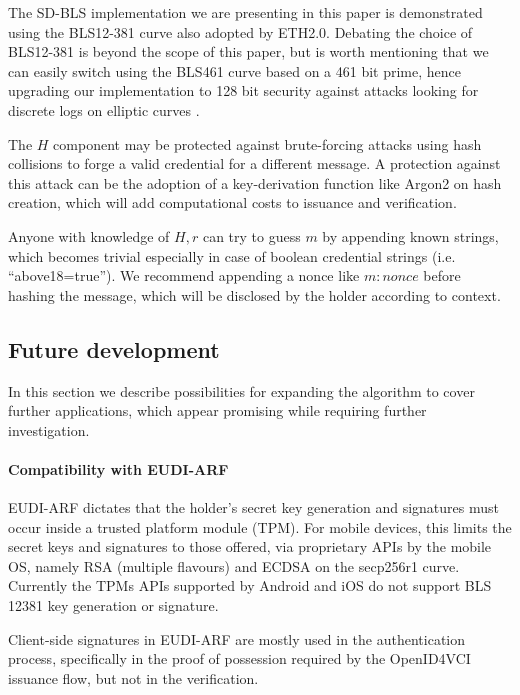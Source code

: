 The SD-BLS implementation we are presenting in this paper is
demonstrated using the BLS12-381 curve \cite{bls381-12} also adopted
by ETH2.0. Debating the choice of BLS12-381 is beyond the scope of
this paper, but is worth mentioning that we can easily switch using
the BLS461 curve based on a 461 bit prime, hence upgrading our
implementation to 128 bit security \cite{updating-key-pairings}
against attacks looking for discrete logs on elliptic curves
\cite{discrete-log-attack}.

The $H$ component may be protected against brute-forcing attacks using
hash collisions to forge a valid credential for a different message. A
protection against this attack can be the adoption of a key-derivation
function like Argon2 \cite{argon2} on hash creation, which will add
computational costs to issuance and verification.

Anyone with knowledge of $H,r$ can try to guess $m$ by appending known
strings, which becomes trivial especially in case of boolean
credential strings (i.e. ``above18=true''). We recommend appending a
nonce like $m:nonce$ before hashing the message, which will be
disclosed by the holder according to context.

\subsection{Future development}

In this section we describe possibilities for expanding the algorithm
to cover further applications, which appear promising while requiring
further investigation.

\paragraph{Compatibility with EUDI-ARF}

EUDI-ARF dictates that the holder's secret key generation and
signatures must occur inside a trusted platform module (TPM). For
mobile devices, this limits the secret keys and signatures to those
offered, via proprietary APIs by the mobile OS, namely RSA (multiple
flavours) and ECDSA on the secp256r1 curve. Currently the TPMs APIs
supported by Android and iOS do not support BLS 12381 key generation
or signature.

Client-side signatures in EUDI-ARF are mostly used in the
authentication process, specifically in the proof of possession
required by the OpenID4VCI\cite{OID4VCI} issuance flow, but not in the
verification.

